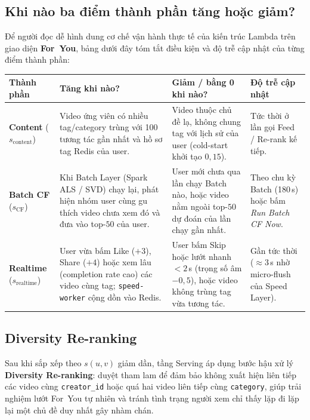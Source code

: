 \subsection{Khi nào ba điểm thành phần tăng hoặc giảm?}

Để người đọc dễ hình dung cơ chế vận hành thực tế của kiến trúc Lambda trên giao diện \textbf{For~You}, bảng dưới đây tóm tắt điều kiện và độ trễ cập nhật của từng điểm thành phần:

\begin{center}
{\small\SingleSpacing
\renewcommand{\arraystretch}{1.12}
\begin{tabularx}{\textwidth}{@{}>{\raggedright\arraybackslash}p{2.7cm}>{\raggedright\arraybackslash}X>{\raggedright\arraybackslash}X>{\raggedright\arraybackslash}p{3.0cm}@{}}
\toprule
Thành phần & Tăng khi nào? & Giảm / bằng 0 khi nào? & Độ trễ cập nhật \\
\midrule
\textbf{Content} ($s_{\mathrm{content}}$) & Video ứng viên có nhiều tag/category trùng với 100 tương tác gần nhất và hồ sơ tag Redis của user. & Video thuộc chủ đề lạ, không chung tag với lịch sử của user (cold-start khởi tạo $0{,}15$). & Tức thời ở lần gọi Feed / Re-rank kế tiếp. \\
\textbf{Batch CF} ($s_{\mathrm{CF}}$) & Khi Batch Layer (Spark ALS / SVD) chạy lại, phát hiện nhóm user cùng gu thích video chưa xem đó và đưa vào top-$50$ của user. & User mới chưa qua lần chạy Batch nào, hoặc video nằm ngoài top-$50$ dự đoán của lần chạy gần nhất. & Theo chu kỳ Batch (180\,s) hoặc bấm \textit{Run Batch CF Now}. \\
\textbf{Realtime} ($s_{\mathrm{realtime}}$) & User vừa bấm Like ($+3$), Share ($+4$) hoặc xem lâu (completion rate cao) các video cùng tag; \texttt{speed-worker} cộng dồn vào Redis. & User bấm Skip hoặc lướt nhanh $<2$\,s (trọng số âm $-0{,}5$), hoặc video không trùng tag vừa tương tác. & Gần tức thời ($\approx 3$\,s nhờ micro-flush của Speed Layer). \\
\bottomrule
\end{tabularx}}
\end{center}

\subsection{Diversity Re-ranking}

Sau khi sắp xếp theo $s(u,v)$ giảm dần, tầng Serving áp dụng bước hậu xử lý \textbf{Diversity Re-ranking}: duyệt tham lam để đảm bảo không xuất hiện liên tiếp các video cùng \texttt{creator\_id} hoặc quá hai video liên tiếp cùng \texttt{category}, giúp trải nghiệm lướt For~You tự nhiên và tránh tình trạng người xem chỉ thấy lặp đi lặp lại một chủ đề duy nhất gây nhàm chán.
